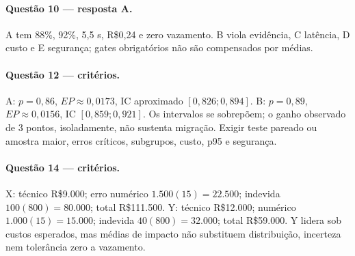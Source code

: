 \paragraph{Questão 10 — resposta A.} A tem 88\%, 92\%, 5,5 s, R\$0,24 e zero vazamento. B viola evidência, C latência, D custo e E segurança; gates obrigatórios não são compensados por médias.

\paragraph{Questão 12 — critérios.} A: $p=0{,}86$, $EP\approx0{,}0173$, IC aproximado $[0{,}826;0{,}894]$. B: $p=0{,}89$, $EP\approx0{,}0156$, IC $[0{,}859;0{,}921]$. Os intervalos se sobrepõem; o ganho observado de 3 pontos, isoladamente, não sustenta migração. Exigir teste pareado ou amostra maior, erros críticos, subgrupos, custo, p95 e segurança.

\paragraph{Questão 14 — critérios.} X: técnico R\$9.000; erro numérico $1.500(15)=22.500$; indevida $100(800)=80.000$; total R\$111.500. Y: técnico R\$12.000; numérico $1.000(15)=15.000$; indevida $40(800)=32.000$; total R\$59.000. Y lidera sob custos esperados, mas médias de impacto não substituem distribuição, incerteza nem tolerância zero a vazamento.
